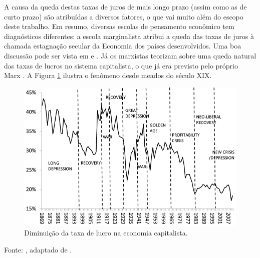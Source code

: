 \documentclass[
	12pt,				%
	oneside,			%
	a4paper,			%
	chapter=TITLE,		%
	section=TITLE,		%
	english,			%
	brazil				%
	]{abntex2}
\newcommand{\bcenter}{\begin{center}}
\newcommand{\ecenter}{\end{center}}
\begin{document}
A causa da queda destas taxas de juros de mais longo prazo (assim como as de
curto prazo) são atribuídas a diversos fatores, o que vai muito além do escopo
deste trabalho. Em resumo, diversas escolas de pensamento econômico tem
diagnósticos diferentes: a escola marginalista atribui a queda das taxas de
juros à chamada estagnação secular da Economia dos países desenvolvidos. Uma boa
discussão pode ser vista em \textcite{bresser2018} e \textcite{krugman2020}. Já os marxistas
teorizam sobre uma queda natural das taxas de lucros no sistema capitalista,
o que já era previsto pelo próprio Marx \autocite{roberts2020}. A Figura \ref{fig:roberts}
ilustra o fenômeno desde meados do século XIX.
\begin{figure}[H]

{\centering \includegraphics[width=1\linewidth]{images/wrp-2} 

}

\caption{Diminuição da taxa de lucro na economia capitalista.}\label{fig:roberts}
\end{figure}
\bcenter

Fonte: \textcite{roberts2020}, adaptado de \textcite{crisis}.
\ecenter
\end{document}
